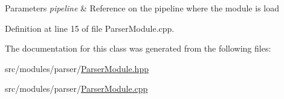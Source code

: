 \begin{DoxyParams}{Parameters}
{\em pipeline} & Reference on the pipeline where the module is load \\
\hline
\end{DoxyParams}


Definition at line 15 of file Parser\+Module.\+cpp.



The documentation for this class was generated from the following files\+:\begin{DoxyCompactItemize}
\item 
src/modules/parser/\hyperlink{_parser_module_8hpp}{Parser\+Module.\+hpp}\item 
src/modules/parser/\hyperlink{_parser_module_8cpp}{Parser\+Module.\+cpp}\end{DoxyCompactItemize}
